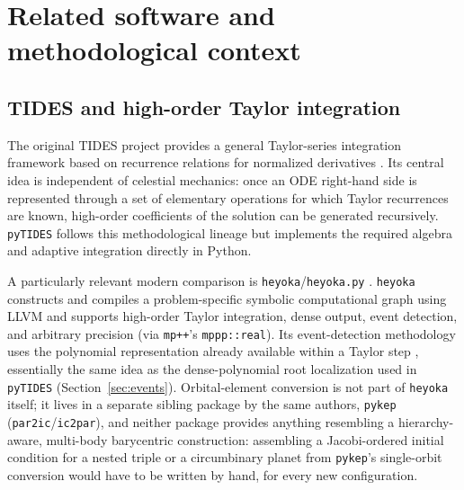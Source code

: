 \documentclass[11pt]{article}
\begin{document}
\section{Related software and methodological context}
\label{sec:related}

\subsection{TIDES and high-order Taylor integration}

The original TIDES project provides a general Taylor-series integration
framework based on recurrence relations for normalized derivatives
\citep{Abad2012}. Its central idea is independent of celestial mechanics:
once an ODE right-hand side is represented through a set of elementary
operations for which Taylor recurrences are known, high-order coefficients
of the solution can be generated recursively. \texttt{pyTIDES} follows this
methodological lineage but implements the required algebra and adaptive
integration directly in Python.

A particularly relevant modern comparison is
\texttt{heyoka}/\texttt{heyoka.py} \citep{Biscani2021}. \texttt{heyoka}
constructs and compiles a problem-specific symbolic computational graph using
LLVM and supports high-order Taylor integration, dense output, event
detection, and arbitrary precision (via \texttt{mp++}'s \texttt{mppp::real}).
Its event-detection methodology uses the polynomial representation already
available within a Taylor step \citep{Biscani2022}, essentially the same
idea as the dense-polynomial root localization used in \texttt{pyTIDES}
(Section~\ref{sec:events}). Orbital-element conversion is not part of
\texttt{heyoka} itself; it lives in a separate sibling package by the same
authors, \texttt{pykep} (\texttt{par2ic}/\texttt{ic2par}), and neither
package provides anything resembling a hierarchy-aware, multi-body
barycentric construction: assembling a Jacobi-ordered initial condition for
a nested triple or a circumbinary planet from \texttt{pykep}'s single-orbit
conversion would have to be written by hand, for every new configuration.
\end{document}
